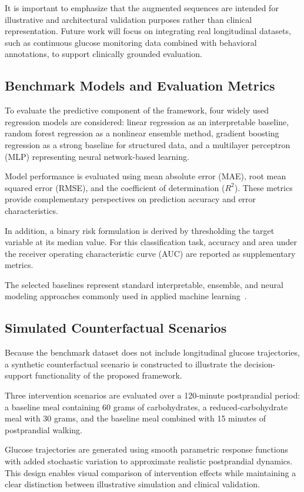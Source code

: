 \documentclass[journal]{IEEEtran}
\begin{document}
It is important to emphasize that the augmented sequences are intended for illustrative and architectural validation purposes rather than clinical representation. Future work will focus on integrating real longitudinal datasets, such as continuous glucose monitoring data combined with behavioral annotations, to support clinically grounded evaluation.

\subsection{Benchmark Models and Evaluation Metrics}
To evaluate the predictive component of the framework, four widely used regression models are considered: linear regression as an interpretable baseline, random forest regression as a nonlinear ensemble method, gradient boosting regression as a strong baseline for structured data, and a multilayer perceptron (MLP) representing neural network-based learning.

Model performance is evaluated using mean absolute error (MAE), root mean squared error (RMSE), and the coefficient of determination ($R^2$). These metrics provide complementary perspectives on prediction accuracy and error characteristics.

In addition, a binary risk formulation is derived by thresholding the target variable at its median value. For this classification task, accuracy and area under the receiver operating characteristic curve (AUC) are reported as supplementary metrics.

The selected baselines represent standard interpretable, ensemble, and neural modeling approaches commonly used in applied machine learning~\cite{ref28,ref29,ref30,ref31}.

\subsection{Simulated Counterfactual Scenarios}
Because the benchmark dataset does not include longitudinal glucose trajectories, a synthetic counterfactual scenario is constructed to illustrate the decision-support functionality of the proposed framework.

Three intervention scenarios are evaluated over a 120-minute postprandial period: a baseline meal containing 60 grams of carbohydrates, a reduced-carbohydrate meal with 30 grams, and the baseline meal combined with 15 minutes of postprandial walking.

Glucose trajectories are generated using smooth parametric response functions with added stochastic variation to approximate realistic postprandial dynamics. This design enables visual comparison of intervention effects while maintaining a clear distinction between illustrative simulation and clinical validation.
\end{document}

